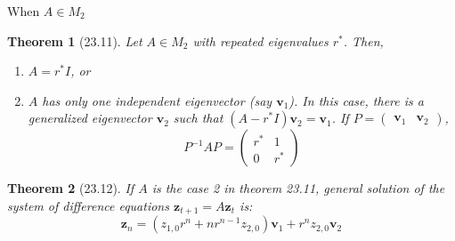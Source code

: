 \documentclass[a4paper,11pt]{article}
\newtheorem{thm}{Theorem}
\newcommand{\bd}{\mathbf}
\begin{document}
\begin{frame}[t]{When $A\in M_2$}
	\begin{thm}
		[23.11] Let $A\in M_2$ with repeated eigenvalues $r^\ast$. Then, 
		\begin{enumerate}
			\item $A=r^\ast I$, or
			\item $A$ has only one independent eigenvector (say $\bd{v}_1$). In this case, there is a generalized eigenvector $\bd{v}_2$ such that $(A-r^\ast I)\bd{v}_2 = \bd{v}_1$. If $P=\begin{pmatrix}
				\bd{v}_1 & \bd{v}_2
			\end{pmatrix}$, \[
				P^{-1}AP = \begin{pmatrix}
					r^\ast & 1 \\
					0 & r^\ast
				\end{pmatrix}
			\]
		\end{enumerate}
	\end{thm}
	\begin{thm}
		[23.12] If $A$ is the case 2 in theorem 23.11, general solution of the system of difference equations $\bd{z}_{t+1}=A\bd{z}_t$ is: \[
			\bd{z}_n = (z_{1,0}r^n + nr^{n-1}z_{2,0})\bd{v}_1+r^n z_{2,0}\bd{v}_2
		\]
	\end{thm}
\end{frame}
\end{document}
